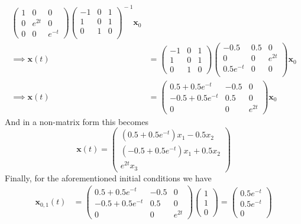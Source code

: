 \documentclass[12pt]{article}
\begin{document}
\begin{enumerate}
\begin{align*}
                \begin{pmatrix} 1 & 0 & 0\\ 0 & e^{2t} & 0\\ 0 & 0 & e^{-t} \end{pmatrix}
                \begin{pmatrix} -1 & 0 & 1\\ 1 & 0 & 1\\ 0 & 1 & 0\\ \end{pmatrix}^{\!-1}\mathbf{x}_{0}\\
\implies \mathbf{x}(t) &= \begin{pmatrix} -1 & 0 & 1\\ 1 & 0 & 1\\ 0 & 1 & 0 \end{pmatrix} \begin{pmatrix} -0.5 & 0.5 & 0\\ 0 & 0 & e^{2t}\\ 0.5e^{-t} & 0 & 0\\ \end{pmatrix}\mathbf{x}_{0}\\
\implies \mathbf{x}(t) &= \begin{pmatrix} 0.5+0.5e^{-t} & -0.5 & 0\\ -0.5+0.5e^{-t} & 0.5 & 0\\ 0 & 0 & e^{2t}\end{pmatrix}\mathbf{x}_{0}
\end{align*}
And in a non-matrix form this becomes 
\[
\mathbf{x}(t)=\begin{pmatrix} (0.5 + 0.5e^{-t})x_{1} - 0.5x_{2}\\ (-0.5 + 0.5e^{-t})x_{1} + 0.5x_{2}\\ e^{2t}x_{3}\end{pmatrix}
\]
Finally, for the aforementioned initial conditions we have
\begin{align*}
\mathbf{x}_{0,1}(t)&=\begin{pmatrix} 0.5+0.5e^{-t} & -0.5 & 0\\ -0.5+0.5e^{-t} & 0.5 & 0\\ 0 & 0 & e^{2t}\end{pmatrix} \begin{pmatrix} 1\\ 1\\ 0 \end{pmatrix} = \begin{pmatrix} 0.5e^{-t}\\ 0.5e^{-t}\\ 0 \end{pmatrix}\\

\end{align*}
\end{enumerate}
\end{document}
